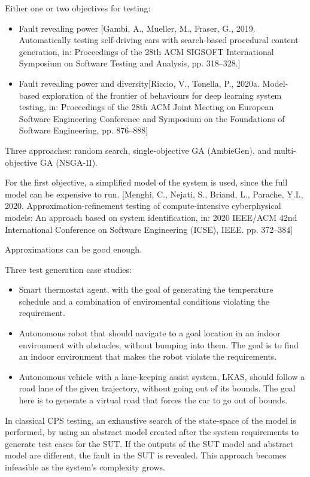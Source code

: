 Either one or two objectives for testing:
\begin{itemize}
    \item Fault revealing power
        [Gambi, A., Mueller, M., Fraser, G., 2019. Automatically testing
        self-driving cars with search-based procedural content generation, in:
        Proceedings of the 28th ACM SIGSOFT International Symposium on
        Software Testing and Analysis, pp. 318–328.]

    \item Fault revealing power and diversity[Riccio, V., Tonella, P., 2020a. Model-based exploration of the frontier
    of behaviours for deep learning system testing, in: Proceedings of the
    28th ACM Joint Meeting on European Software Engineering Conference and Symposium on the Foundations of Software Engineering,
    pp. 876–888]
\end{itemize}

 Three approaches: random search, single-objective GA (AmbieGen), and multi-objective GA (NSGA-II).

For the first objective, a simplified  model of the system is used, since the full model can be expensive to run.
 [Menghi, C., Nejati, S., Briand, L., Parache, Y.I., 2020.
 Approximation-refinement testing of compute-intensive cyberphysical models: An approach based on system identification,
 in: 2020 IEEE/ACM 42nd International Conference on Software
 Engineering (ICSE), IEEE. pp. 372–384]

Approximations can be good enough.

Three test generation case studies:
\begin{itemize}
    \item Smart thermostat agent, with the goal of generating the temperature schedule and a combination of enviromental conditions violating the requirement.
    \item Autonomous robot that should navigate to a goal location in an indoor environment with obstacles, without bumping into them. The goal is to find an indoor environment that makes the robot violate the requirements.
    \item Autonomous vehicle with a lane-keeping assist system, LKAS, should follow a road lane of the given trajectory, without going out of its bounds. The goal here is to generate a virtual road that forces the car to go out of bounds.
\end{itemize}


In classical CPS testing, an exhaustive search of the state-space of the model is performed, by using an abstract model created after the system requirements to generate test cases for the SUT. If the outputs of the SUT model and abstract model are different, the fault in the SUT is revealed.
This approach becomes infeasible as the system's complexity grows.

